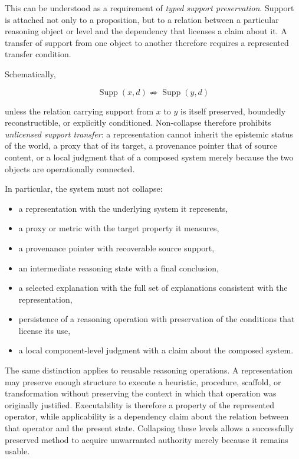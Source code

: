 \documentclass[11pt]{article}
\begin{document}
This can be understood as a requirement of \emph{typed support preservation}. Support is attached not only to a proposition, but to a relation between a particular reasoning object or level and the dependency that licenses a claim about it. A transfer of support from one object to another therefore requires a represented transfer condition.

Schematically,

\[
\operatorname{Supp}(x,d)
\not\Rightarrow
\operatorname{Supp}(y,d)
\]

unless the relation carrying support from \(x\) to \(y\) is itself preserved, boundedly reconstructible, or explicitly conditioned. Non-collapse therefore prohibits \emph{unlicensed support transfer}: a representation cannot inherit the epistemic status of the world, a proxy that of its target, a provenance pointer that of source content, or a local judgment that of a composed system merely because the two objects are operationally connected.

In particular, the system must not collapse:
\begin{itemize}[leftmargin=1.5em]
    \item a representation with the underlying system it represents,
    \item a proxy or metric with the target property it measures,
    \item a provenance pointer with recoverable source support,
    \item an intermediate reasoning state with a final conclusion,
    \item a selected explanation with the full set of explanations consistent with the representation,
    \item persistence of a reasoning operation with preservation of the conditions that license its use,
    \item a local component-level judgment with a claim about the composed system.
\end{itemize}

The same distinction applies to reusable reasoning operations. A representation may preserve enough structure to execute a heuristic, procedure, scaffold, or transformation without preserving the context in which that operation was originally justified. Executability is therefore a property of the represented operator, while applicability is a dependency claim about the relation between that operator and the present state. Collapsing these levels allows a successfully preserved method to acquire unwarranted authority merely because it remains usable.
\end{document}
